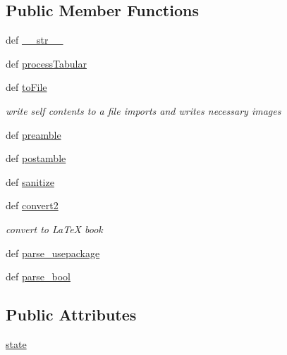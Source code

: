 \subsection*{\-Public \-Member \-Functions}
\begin{DoxyCompactItemize}
\item 
def \hyperlink{classuicilibris_1_1w2book_1_1wiki2_aebf095bf2882eba45654efa22208a279}{\-\_\-\-\_\-str\-\_\-\-\_\-}
\item 
def \hyperlink{classuicilibris_1_1w2book_1_1wiki2_ae23c5f96c061eec8a575b293879b82ee}{process\-Tabular}
\item 
def \hyperlink{classuicilibris_1_1w2book_1_1wiki2_a7959787936e6ba25fa4478c87f362dcb}{to\-File}
\begin{DoxyCompactList}\small\item\em write self contents to a file imports and writes necessary images \end{DoxyCompactList}\item 
def \hyperlink{classuicilibris_1_1w2book_1_1wiki2_ae352150eb67b1cb6c67ee3137f0cf773}{preamble}
\item 
def \hyperlink{classuicilibris_1_1w2book_1_1wiki2_a074e8ba5278ac244c7b5402275abbc42}{postamble}
\item 
def \hyperlink{classuicilibris_1_1w2book_1_1wiki2_abd7f7826ccd713041b9ac86dd9ce4084}{sanitize}
\item 
def \hyperlink{classuicilibris_1_1w2book_1_1wiki2_ac94ea48f5b21a87eb0dda32a26be71c5}{convert2}
\begin{DoxyCompactList}\small\item\em convert to \-La\-Te\-X book \end{DoxyCompactList}\item 
def \hyperlink{classuicilibris_1_1w2book_1_1wiki2_a74c8ffd775e73f877a98adc48592a488}{parse\-\_\-usepackage}
\item 
def \hyperlink{classuicilibris_1_1w2book_1_1wiki2_a65fc5e3a732878444028091cbd03ac76}{parse\-\_\-bool}
\end{DoxyCompactItemize}
\subsection*{\-Public \-Attributes}
\begin{DoxyCompactItemize}
\item 
\hyperlink{classuicilibris_1_1w2book_1_1wiki2_ab1461398f11b498a73d850d22220fca4}{state}
\end{DoxyCompactItemize}


